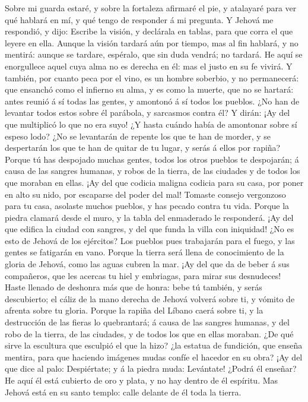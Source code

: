  Sobre mi guarda estaré, y sobre la fortaleza afirmaré el
pie, y atalayaré para ver qué hablará en mí, y qué tengo de responder á
mi pregunta.  Y Jehová me respondió, y dijo: Escribe la
visión, y declárala en tablas, para que corra el que leyere en ella.
 Aunque la visión tardará aún por tiempo, mas al fin
hablará, y no mentirá: aunque se tardare, espéralo, que sin duda vendrá;
no tardará.  He aquí se enorgullece aquel cuya alma no es
derecha en él: mas el justo en su fe vivirá.  Y también,
por cuanto peca por el vino, es un hombre soberbio, y no permanecerá:
que ensanchó como el infierno su alma, y es como la muerte, que no se
hartará: antes reunió á sí todas las gentes, y amontonó á sí todos los
pueblos.  ¿No han de levantar todos estos sobre él
parábola, y sarcasmos contra él? Y dirán: ¡Ay del que multiplicó lo que
no era suyo! ¿Y hasta cuándo había de amontonar sobre sí espeso lodo?
 ¿No se levantarán de repente los que te han de morder, y
se despertarán los que te han de quitar de tu lugar, y serás á ellos por
rapiña?  Porque tú has despojado muchas gentes, todos los
otros pueblos te despojarán; á causa de las sangres humanas, y robos de
la tierra, de las ciudades y de todos los que moraban en ellas.
 ¡Ay del que codicia maligna codicia para su casa, por
poner en alto su nido, por escaparse del poder del mal! 
Tomaste consejo vergonzoso para tu casa, asolaste muchos pueblos, y has
pecado contra tu vida.  Porque la piedra clamará desde el
muro, y la tabla del enmaderado le responderá.  ¡Ay del
que edifica la ciudad con sangres, y del que funda la villa con
iniquidad!  ¿No es esto de Jehová de los ejércitos? Los
pueblos pues trabajarán para el fuego, y las gentes se fatigarán en
vano.  Porque la tierra será llena de conocimiento de la
gloria de Jehová, como las aguas cubren la mar.  ¡Ay del
que da de beber á sus compañeros, que les acercas tu hiel y embriagas,
para mirar sus desnudeces!  Haste llenado de deshonra más
que de honra: bebe tú también, y serás descubierto; el cáliz de la mano
derecha de Jehová volverá sobre ti, y vómito de afrenta sobre tu gloria.
 Porque la rapiña del Líbano caerá sobre ti, y la
destrucción de las fieras lo quebrantará; á causa de las sangres
humanas, y del robo de la tierra, de las ciudades, y de todos los que en
ellas moraban.  ¿De qué sirve la escultura que esculpió
el que la hizo? ¿la estatua de fundición, que enseña mentira, para que
haciendo imágenes mudas confíe el hacedor en su obra? 
¡Ay del que dice al palo: Despiértate; y á la piedra muda: Levántate!
¿Podrá él enseñar? He aquí él está cubierto de oro y plata, y no hay
dentro de él espíritu.  Mas Jehová está en su santo
templo: calle delante de él toda la tierra.

